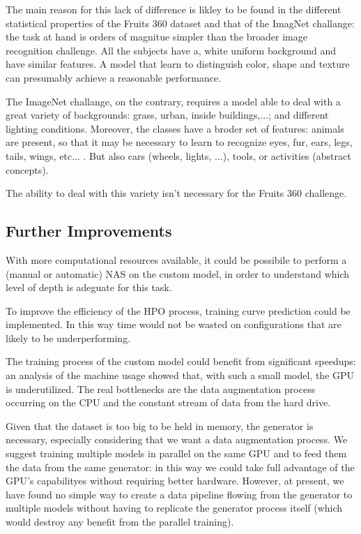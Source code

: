 The main reason for this lack of difference is likley to be found in the different statistical properties of the Fruits 360 dataset and that of the ImagNet challange: the task at hand is orders of magnitue simpler than the broader image recognition challenge. All the subjects have a, white uniform background and have similar features. A model that learn to distinguish color, shape and texture can presumably achieve a reasonable performance.

The ImageNet challange, on the contrary, requires a model able to deal with a great variety of backgrounds: grass, urban, inside buildings,...; and different lighting conditions. Moreover, the classes have a broder set of features: animals are present, so that it may be necessary to learn to recognize eyes, fur, ears, legs, tails, wings, etc... . But also cars (wheels, lights, ...), tools, or activities (abstract concepts).

The ability to deal with this variety isn't necessary for the Fruits 360 challenge. 



\subsection{Further Improvements}\label{furtherimprovements}
With more computational resources available, it could be possibile to perform a (manual or automatic) NAS on the custom model, in order to understand which level of depth is adeguate for this task.

To improve the efficiency of the HPO process, training curve prediction could be implemented. In this way time would not be wasted on configurations that are likely to be underperforming.

The training process of the custom model could benefit from significant speedups: an analysis of the machine usage showed that, with such a small model, the GPU is underutilized. The real bottlenecks are the data augmentation process occurring on the CPU and the constant stream of data from the hard drive.

Given that the dataset is too big to be held in memory, the generator is necessary, especially considering that we want a data augmentation process. We suggest training multiple models in parallel on the same GPU and to feed them the data from the same generator: in this way we could take full advantage of the GPU's capabilityes without requiring better hardware. However, at present, we have found no simple way to create a data pipeline flowing from the generator to multiple models without having to replicate the generator process itself (which would destroy any benefit from the parallel training).

